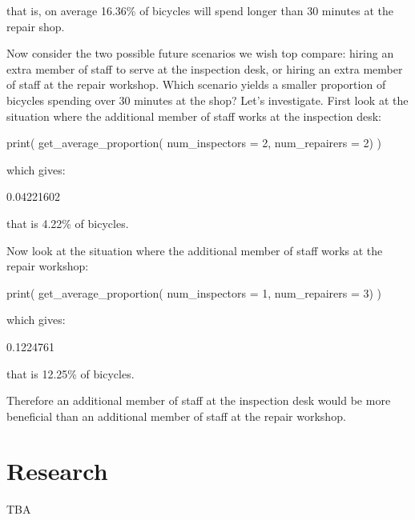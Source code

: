 that is, on average 16.36\% of bicycles will spend longer than 30 minutes at the
repair shop.

Now consider the two possible future scenarios we wish top compare: hiring an
extra member of staff to serve at the inspection desk, or hiring an extra member
of staff at the repair workshop. Which scenario yields a smaller proportion of
bicycles spending over 30 minutes at the shop? Let's investigate. First look at
the situation where the additional member of staff works at the inspection desk:

\begin{Rin}
print(
  get_average_proportion(
    num_inspectors = 2,
    num_repairers = 2)
)
\end{Rin}

which gives:

\begin{Rout}
[1] 0.04221602
\end{Rout}

that is 4.22\% of bicycles.

Now look at the situation where the additional member of staff works at the
repair workshop:

\begin{Rin}
print(
  get_average_proportion(
    num_inspectors = 1,
    num_repairers = 3)
)
\end{Rin}

which gives:

\begin{Rout}
[1] 0.1224761
\end{Rout}

that is 12.25\% of bicycles.

Therefore an additional member of staff at the inspection desk would be more
beneficial than an additional member of staff at the repair workshop.


\section{Research}\label{sec:research}

TBA
